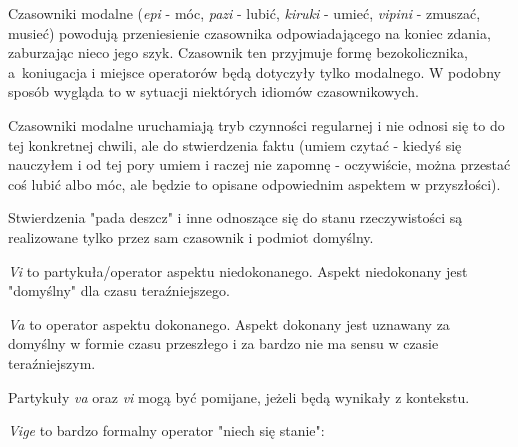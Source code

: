 
Czasowniki modalne (\emph{epi} - móc, \emph{pazi} - lubić, \emph{kiruki} - 
umieć, \emph{vipini} - zmuszać, musieć) powodują przeniesienie czasownika 
odpowiadającego na koniec zdania, zaburzając nieco jego szyk. Czasownik ten 
przyjmuje formę bezokolicznika, a~koniugacja i miejsce operatorów będą dotyczyły
tylko modalnego. W podobny sposób wygląda to w sytuacji niektórych idiomów 
czasownikowych.



Czasowniki modalne uruchamiają tryb czynności regularnej i nie odnosi się to do 
tej konkretnej chwili, ale do stwierdzenia faktu (umiem czytać - kiedyś się 
nauczyłem i od tej pory umiem i raczej nie zapomnę - oczywiście, można przestać
coś lubić albo móc, ale będzie to opisane odpowiednim aspektem w przyszłości).

Stwierdzenia "pada deszcz" i inne odnoszące się do stanu rzeczywistości są 
realizowane tylko przez sam czasownik i podmiot domyślny.



\emph{Vi} to partykuła/operator aspektu niedokonanego. Aspekt niedokonany jest 
"domyślny" dla czasu teraźniejszego.




\emph{Va} to operator aspektu dokonanego. Aspekt dokonany jest uznawany za 
domyślny w formie czasu przeszłego i za bardzo nie ma sensu w czasie 
teraźniejszym.




Partykuły \emph{va} oraz \emph{vi} mogą być pomijane, jeżeli będą wynikały z 
kontekstu.

\emph{Vige} to bardzo formalny operator "niech się stanie":

